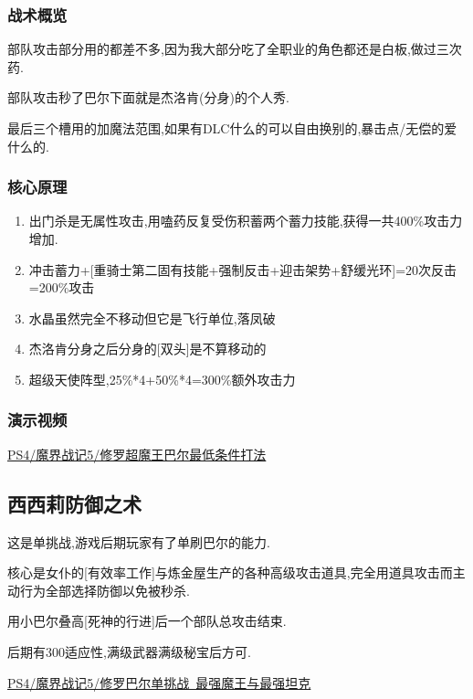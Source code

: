 	\subsubsection{战术概览}

	部队攻击部分用{\color{red}{大魔拳超魔流刷过全职业}}的都差不多,因为我大部分吃了全职业的角色都还是白板,做过三次药.

	部队攻击秒了巴尔下面就是杰洛肯(分身)的个人秀.

	最后三个槽用的加魔法范围,如果有DLC什么的可以自由换别的,暴击点/无偿的爱什么的.

	\subsubsection{核心原理}

	\begin{enumerate}
		\item 出门杀是无属性攻击,用嗑药反复受伤积蓄两个蓄力技能,获得一共400\%攻击力增加.

		\item 冲击蓄力+[重骑士第二固有技能+强制反击+迎击架势+舒缓光环]=20次反击=200\%攻击

		\item 水晶虽然完全不移动但它是飞行单位,落凤破

		\item 杰洛肯分身之后分身的[双头]是不算移动的
		
		\item 超级天使阵型,25\%*4+50\%*4=300\%额外攻击力
	\end{enumerate}

	\subsubsection{演示视频}

	\href{http://www.bilibili.com/video/av2976870/}{PS4/魔界战记5/修罗超魔王巴尔最低条件打法}

	\newpage

	\subsection{西西莉防御之术}

	这是单挑战,游戏后期玩家有了单刷巴尔的能力.

	核心是女仆的[有效率工作]与炼金屋生产的各种高级攻击道具,完全用道具攻击而主动行为全部选择防御以免被秒杀.

	用小巴尔叠高[死神的行进]后一个部队总攻击结束.

	后期有300适应性,满级武器满级秘宝后方可.

	\href{http://www.bilibili.com/video/av3465947/index_2.html}{PS4/魔界战记5/修罗巴尔单挑战~最强魔王与最强坦克}
